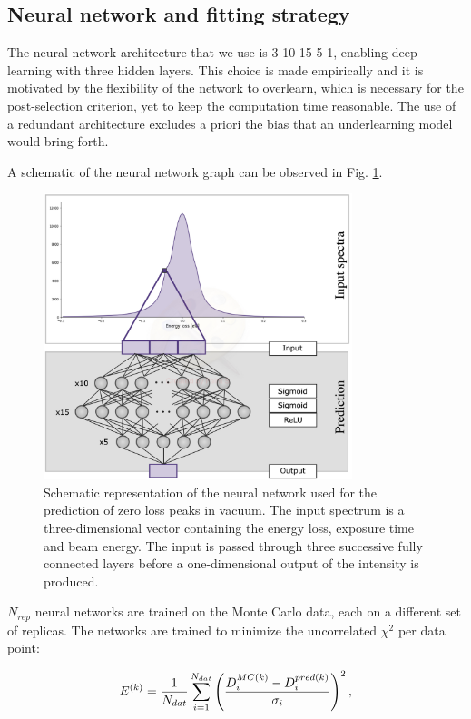\documentclass[11pt,a4paper]{article}
\def\frac#1#2{{{#1}\over {#2}}}
\numberwithin{equation}{section}
\numberwithin{figure}{section}
\numberwithin{table}{section}
\begin{document}
\subsection{Neural network and fitting strategy}
The neural network architecture that we use is 3-10-15-5-1, enabling deep learning with three hidden layers. This choice is made empirically and it is motivated by the flexibility of the network to overlearn, which is necessary for the post-selection criterion, yet to keep the computation time reasonable. The use of a redundant architecture excludes a priori the bias that an underlearning model would bring forth. 

A schematic of the neural network graph can be observed in Fig. \ref{architecture}. 
\begin{figure}[H]
    \centering
    \includegraphics[width=90mm]{plots/architecture.jpg}
    \caption{Schematic representation of the neural network used for the prediction of zero loss peaks in vacuum. The input spectrum is a three-dimensional vector containing the energy loss, exposure time and beam energy. The input is passed through three successive fully connected layers before a one-dimensional output of the intensity is produced.}
    \label{architecture}
\end{figure}

$N_{rep}$ neural networks are trained on the Monte Carlo data, each on a different set of replicas. The networks are trained to minimize the uncorrelated $\chi^2$ per data point:

\begin{equation} \label{eq:chi2}
    E^{(k)} = \frac{1}{N_{dat}}\sum_{i=1}^{N_{dat}}\left(\frac{D_i^{MC(k)} - D_i^{pred(k)}}{\sigma_i}\right)^2, 
\end{equation}
\end{document}
